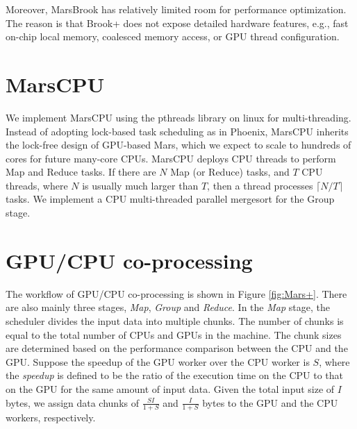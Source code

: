 Moreover, MarsBrook has relatively limited room for performance optimization.
The reason is that Brook+ does not expose detailed hardware
features, e.g., fast on-chip local memory, coalesced memory access,
or GPU thread configuration.




\section{MarsCPU}
We implement MarsCPU using the pthreads library on linux for multi-threading.
Instead of adopting lock-based task scheduling as in Phoenix,
MarsCPU inherits the lock-free design of GPU-based Mars, which we expect to scale to hundreds of cores for future many-core CPUs.
MarsCPU deploys CPU threads to perform Map and Reduce tasks.
If there are $N$ Map (or Reduce) tasks, and $T$ CPU threads, where $N$ is usually much larger than $T$, then a thread processes $\lceil N/T \rceil$ tasks.
We implement a CPU multi-threaded parallel mergesort for the Group stage.

\section{GPU/CPU co-processing} \label{sec-coprocessing}


The workflow of GPU/CPU co-processing is shown in Figure \ref{fig:Mars+}.
There are also mainly three stages, {\em Map}, {\em Group} and {\em Reduce}.
In the {\em Map} stage,
the scheduler divides the input data into multiple chunks. The
number of chunks is equal to the total number of CPUs and GPUs in
the machine. The chunk sizes are determined based on the performance
comparison between the CPU and the GPU. Suppose the speedup of the
GPU worker over the CPU worker is $S$, where the {\em speedup} is
defined to be the ratio of the execution time on the CPU to that on
the GPU for the same amount of input data. Given the total input
size of $I$ bytes, we assign data chunks of $\frac{SI}{1+S}$ and
$\frac{I}{1+S}$ bytes to the GPU and the CPU workers, respectively.

